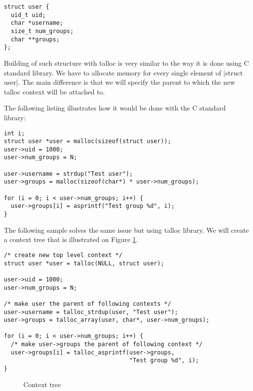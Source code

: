 \begin{lstlisting}[caption={struct user},label={struct-user}]
struct user {
  uid_t uid;
  char *username;
  size_t num_groups;
  char **groups;
};
\end{lstlisting}

Building of such structure with talloc is very similar to the way it is done
using C standard library. We have to allocate memory for every single element of
|struct user|. The main difference is that we will specify the parent to which
the new talloc context will be attached to.

The following listing illustrates how it would be done with the C standard
library:

\begin{lstlisting}[caption={Building struct user -- C standard library}]
int i;
struct user *user = malloc(sizeof(struct user));
user->uid = 1000;
user->num_groups = N;

user->username = strdup("Test user");
user->groups = malloc(sizeof(char*) * user->num_groups);

for (i = 0; i < user->num_groups; i++) {
  user->groups[i] = asprintf("Test group %d", i);
}
\end{lstlisting}

\noindent
The following sample solves the same issue but using talloc library. We will
create a context tree that is illustrated on Figure
\ref{fig:context-tree-1-user}.

\begin{lstlisting}[caption={Building struct user -- talloc library},
morekeywords={talloc,talloc_strdup,talloc_array,talloc_asprintf}]
/* create new top level context */
struct user *user = talloc(NULL, struct user);

user->uid = 1000;
user->num_groups = N;

/* make user the parent of following contexts */
user->username = talloc_strdup(user, "Test user");
user->groups = talloc_array(user, char*, user->num_groups);

for (i = 0; i < user->num_groups; i++) {
  /* make user->groups the parent of following context */
  user->groups[i] = talloc_asprintf(user->groups,
                                    "Test group %d", i);
}
\end{lstlisting}

\begin{figure}[H]
  \centering
  
  \caption{Context tree}
  \label{fig:context-tree-1-user}
\end{figure}

